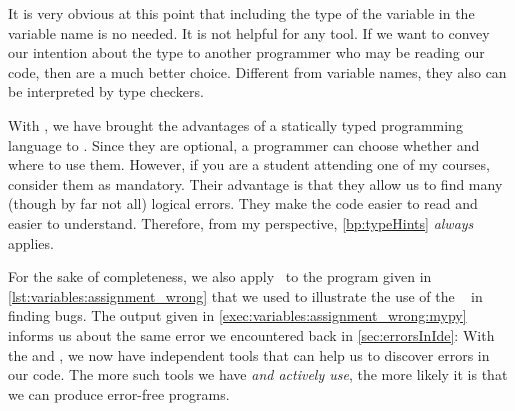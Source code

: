 It is very obvious at this point that including the type of the variable in the variable name is no needed.
It is not helpful for any tool.
If we want to convey our intention about the type to another programmer who may be reading our code, then  are a much better choice.
Different from variable names, they also can be interpreted by type checkers.

With , we have brought the advantages of a statically typed programming language to \python.
Since they are optional, a programmer can choose whether and where to use them.
However, if you are a student attending one of my courses, consider them as mandatory.
Their advantage is that they allow us to find many (though by far not all) logical errors.
They make the code easier to read and easier to understand.
Therefore, from my perspective, \cref{bp:typeHints} \emph{always} applies.

%
%
%
For the sake of completeness, we also apply \mypy\ to the program  given in \cref{lst:variables:assignment_wrong} that we used to illustrate the use of the \pycharm\  in finding bugs.
The output given in \cref{exec:variables:assignment_wrong:mypy} informs us about the same error we encountered back in \cref{sec:errorsInIde}:
\emph{}
With the  and \mypy, we now have independent tools that can help us to discover errors in our code.
The more such tools we have \emph{and actively use}, the more likely it is that we can produce error-free programs.

